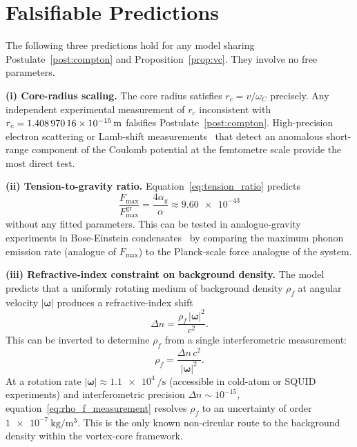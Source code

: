 \documentclass[aps,pra,preprint,longbibliography,nofootinbib]{revtex4-2}
\newcommand{\vc}{v}              %
\newcommand{\rc}{r_c}            %
\newcommand{\omC}{\omega_C}      %
\newcommand{\Fmax}{F_{\max}}     %
\begin{document}
\section{Falsifiable Predictions}
\label{sec:falsifiers}

The following three predictions hold for any model sharing
Postulate~\ref{post:compton} and Proposition~\ref{prop:vc}.
They involve no free parameters.

\medskip
\noindent\textbf{(i) Core-radius scaling.}
The core radius satisfies $\rc = \vc/\omC$ precisely.
Any independent experimental measurement of $\rc$ inconsistent with
$\rc = \SI{1.408\,970\,16e-15}{\meter}$ falsifies
Postulate~\ref{post:compton}.
High-precision electron scattering or Lamb-shift
measurements~\cite{Karshenboim2005} that detect an anomalous
short-range component of the Coulomb potential at the femtometre scale
provide the most direct test.

\medskip
\noindent\textbf{(ii) Tension-to-gravity ratio.}
Equation~\eqref{eq:tension_ratio} predicts
\begin{equation}
  \frac{\Fmax}{\Fmax^{\mathrm{gr}}} = \frac{4\alpha_g}{\alpha}
  \approx \num{9.60e-43}
  \label{eq:pred2}
\end{equation}
without any fitted parameters.
This can be tested in analogue-gravity experiments in Bose-Einstein
condensates~\cite{Barcelo2005} by comparing the maximum phonon emission
rate (analogue of $\Fmax$) to the Planck-scale force analogue of the
system.

\medskip
\noindent\textbf{(iii) Refractive-index constraint on background density.}
The model predicts that a uniformly rotating medium of background density
$\rho_f$ at angular velocity $|\boldsymbol{\omega}|$ produces a
refractive-index shift
\begin{equation}
  \Delta n = \frac{\rho_f\,|\boldsymbol{\omega}|^2}{c^2}.
  \label{eq:refraction}
\end{equation}
This can be inverted to determine $\rho_f$ from a single interferometric
measurement:
\begin{equation}
  \rho_f = \frac{\Delta n\,c^2}{|\boldsymbol{\omega}|^2}.
  \label{eq:rho_f_measurement}
\end{equation}
At a rotation rate $|\boldsymbol{\omega}| \approx \SI{1.1e4}{\per\second}$
(accessible in cold-atom or SQUID experiments) and interferometric
precision $\Delta n \sim 10^{-15}$, equation~\eqref{eq:rho_f_measurement}
resolves $\rho_f$ to an uncertainty of order $\SI{1e-7}{\kilogram\per\cubic\meter}$.
This is the only known non-circular route to the background density
within the vortex-core framework.
\end{document}
